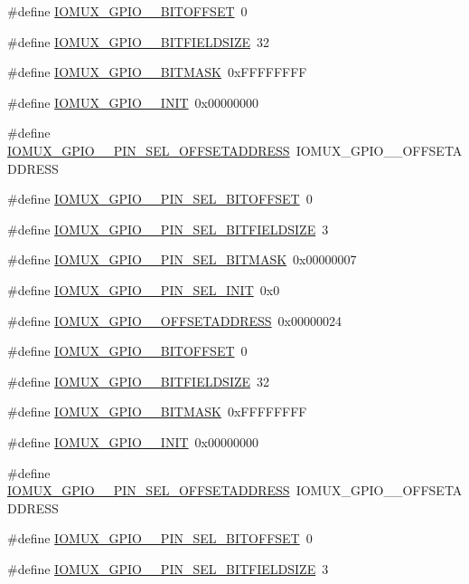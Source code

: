 \begin{DoxyCompactItemize}
\#define \hyperlink{a00560_af9fdc6f07c1b563ba41b879d9619f7b9}{IOMUX\_\-GPIO\_\_\-BITOFFSET}~0
\item 
\#define \hyperlink{a00560_a7f5d581d205c7d87beb6c94580ff9031}{IOMUX\_\-GPIO\_\_\-BITFIELDSIZE}~32
\item 
\#define \hyperlink{a00560_ae41ba8171c2a8a96510f3891163cac55}{IOMUX\_\-GPIO\_\_\-BITMASK}~0xFFFFFFFF
\item 
\#define \hyperlink{a00560_a66c3403a5da2a1d71fb6991a281805b5}{IOMUX\_\-GPIO\_\_\-INIT}~0x00000000
\item 
\#define \hyperlink{a00560_a093db3f4266af10b828610a1c60fbd5e}{IOMUX\_\-GPIO\_\_\-PIN\_\-SEL\_\-OFFSETADDRESS}~IOMUX\_\-GPIO\_\_\-OFFSETADDRESS
\item 
\#define \hyperlink{a00560_aad7aafdca40ed538edd08e666eb2891f}{IOMUX\_\-GPIO\_\_\-PIN\_\-SEL\_\-BITOFFSET}~0
\item 
\#define \hyperlink{a00560_a95c5f0caa4baff4c256320dbbd353a53}{IOMUX\_\-GPIO\_\_\-PIN\_\-SEL\_\-BITFIELDSIZE}~3
\item 
\#define \hyperlink{a00560_a38a1439c4dfe879adf706cbbfd5bb5d4}{IOMUX\_\-GPIO\_\_\-PIN\_\-SEL\_\-BITMASK}~0x00000007
\item 
\#define \hyperlink{a00560_a10688b8beb8d303cd7ba90e3e54b976c}{IOMUX\_\-GPIO\_\_\-PIN\_\-SEL\_\-INIT}~0x0
\item 
\#define \hyperlink{a00560_a125ab3c9b44c4c4d4edb8d65c033fdba}{IOMUX\_\-GPIO\_\_\-OFFSETADDRESS}~0x00000024
\item 
\#define \hyperlink{a00560_ab404cfa60ecb2d05c8161378ed70b9db}{IOMUX\_\-GPIO\_\_\-BITOFFSET}~0
\item 
\#define \hyperlink{a00560_a5f9047c49babe9ed06e6eedae7b867a9}{IOMUX\_\-GPIO\_\_\-BITFIELDSIZE}~32
\item 
\#define \hyperlink{a00560_a992f173c6ee749716495600ef9925d60}{IOMUX\_\-GPIO\_\_\-BITMASK}~0xFFFFFFFF
\item 
\#define \hyperlink{a00560_a1966f226d85f196485914236f5098d31}{IOMUX\_\-GPIO\_\_\-INIT}~0x00000000
\item 
\#define \hyperlink{a00560_a66e2800ccb449cf9790e763d1d29c11b}{IOMUX\_\-GPIO\_\_\-PIN\_\-SEL\_\-OFFSETADDRESS}~IOMUX\_\-GPIO\_\_\-OFFSETADDRESS
\item 
\#define \hyperlink{a00560_a9f8e24ba544ab4b003c5f0d6609fb9d8}{IOMUX\_\-GPIO\_\_\-PIN\_\-SEL\_\-BITOFFSET}~0
\item 
\#define \hyperlink{a00560_a0fe253ef519a000fd23a12e98809417f}{IOMUX\_\-GPIO\_\_\-PIN\_\-SEL\_\-BITFIELDSIZE}~3

\end{DoxyCompactItemize}
